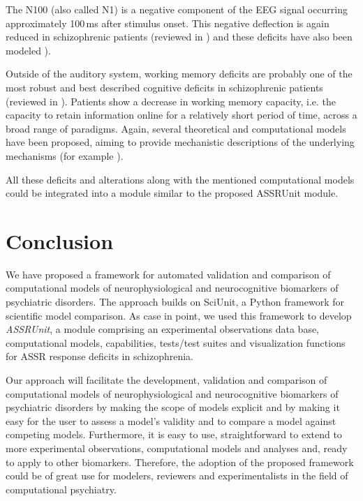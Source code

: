 \documentclass[a4paper,10pt]{article}
\begin{document}
The N100 (also called N1) is a negative component of the EEG signal occurring approximately 100\,ms after stimulus onset. This negative deflection is again reduced in schizophrenic patients 
(reviewed in \cite{Rosburg2008,Rissling2010,Javitt2008}) and these deficits have also been modeled \cite{Ventouras2000}).

Outside of the auditory system, working memory deficits are probably one of the most robust and best described cognitive deficits in schizophrenic patients (reviewed in \cite{Piskulic2007,Lee2005}). Patients
show a decrease in working memory capacity, i.e. the capacity to retain information online for a relatively short period of time, across a broad range of paradigms.
Again, several theoretical and computational models have been proposed, aiming to provide mechanistic descriptions of the underlying mechanisms (for example \cite{Compte2000,Durstewitz2000,Wang2004,Singh2006,Wang2001,Cano2012}). 

All these deficits and alterations along with the mentioned computational models could be integrated into a module similar to the proposed ASSRUnit module.

\section{Conclusion}
We have proposed a framework for automated validation and comparison of computational models of neurophysiological and 
neurocognitive biomarkers of psychiatric disorders. The approach builds on
SciUnit, a Python framework for scientific model comparison. As case in point, we used this framework to develop \textit{ASSRUnit}, a module comprising 
an experimental observations data base, computational models, capabilities, tests/test suites and visualization functions for
ASSR response deficits in schizophrenia. 

Our approach will facilitate the development, validation and comparison of computational models of neurophysiological 
and neurocognitive biomarkers of psychiatric disorders by making the scope of models explicit and by 
making it easy for the user to assess a model's validity and to compare a model against competing models. Furthermore, it is easy to use, 
straightforward to extend to more experimental observations, computational models and analyses and,
ready to apply to other biomarkers. Therefore, the adoption of the proposed framework could be of great use for modelers, reviewers and 
experimentalists in the field of computational psychiatry.


 

\end{document}
